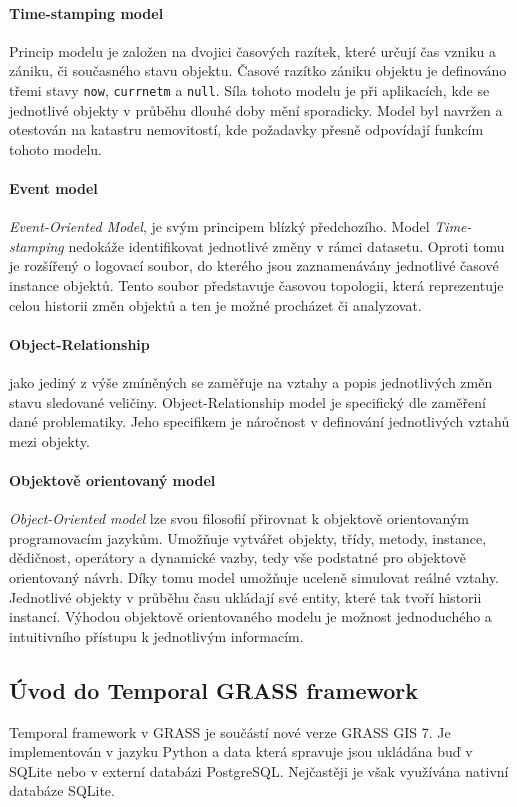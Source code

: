 \documentclass[a4paper,12pt,oneside]{report}
\begin{document}
\paragraph*{Time-stamping model} 
Princip modelu je založen na dvojici časových razítek, které
určují čas vzniku a zániku, či současného stavu
objektu. Časové razítko zániku objektu je definováno třemi stavy
\texttt{now}, \texttt{currnetm} a \texttt{null}.  Síla tohoto modelu
je při aplikacích, kde se jednotlivé objekty v průběhu dlouhé doby
mění sporadicky. Model byl navržen a otestován na katastru
nemovitostí, kde požadavky přesně odpovídají funkcím tohoto
modelu.\cite{hunter}

\paragraph*{Event model}
\textit{Event-Oriented Model}, je svým principem blízký  předchozího. Model \textit{Time-stamping }nedokáže identifikovat jednotlivé změny v
rámci datasetu. Oproti tomu je  rozšířený o logovací
soubor, do kterého jsou zaznamenávány jednotlivé časové instance
objektů. Tento soubor představuje časovou topologii, která
reprezentuje celou historii změn objektů a ten je možné procházet či
analyzovat.

\paragraph*{Object-Relationship}
jako jediný z výše zmíněných se zaměřuje na vztahy a popis
jednotlivých změn stavu sledované veličiny. Object-Relationship model je   specifický dle zaměření
dané problematiky. Jeho specifikem  je  náročnost v definování
jednotlivých vztahů mezi objekty.

\paragraph*{Objektově orientovaný model}
\textit{Object-Oriented model}  lze svou filosofií přirovnat k objektově 
orientovaným programovacím jazykům. Umožňuje vytvářet
objekty, třídy, metody, instance, dědičnost, operátory a dynamické
vazby, tedy vše podstatné pro objektově orientovaný návrh. Díky tomu model umožňuje  uceleně simulovat reálné vztahy.  Jednotlivé objekty
v průběhu času ukládají své entity, které tak tvoří historii
instancí. Výhodou objektově orientovaného modelu je možnost jednoduchého a
intuitivního přístupu k jednotlivým informacím.


\subsection{Úvod do Temporal GRASS framework}
Temporal framework v GRASS je součástí nové verze GRASS GIS 7. Je
implementován v jazyku Python a data která spravuje jsou ukládána buď
v SQLite nebo v externí databázi PostgreSQL. Nejčastěji je však
využívána nativní databáze SQLite.
\end{document}
